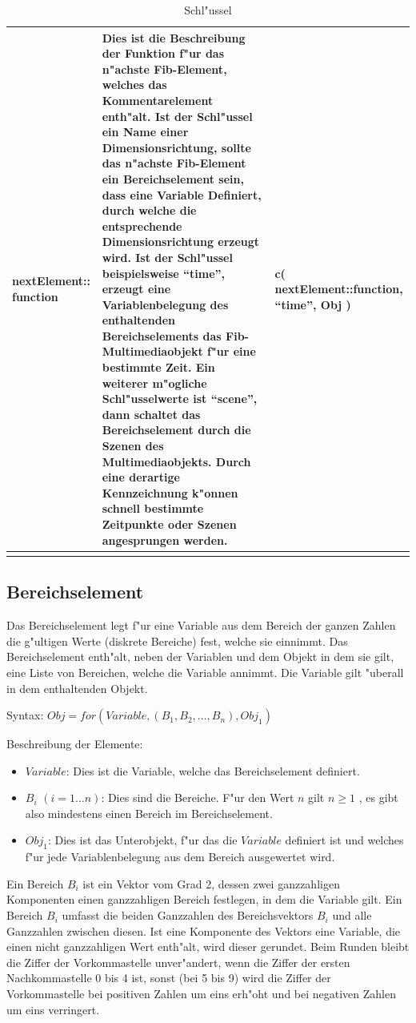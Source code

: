 \begin{center}
\begin{longtable}{|p{20mm}|p{55mm}|p{50mm}|}
	nextElement:: function & Dies ist die Beschreibung der Funktion f"ur das n"achste Fib-Element, welches das Kommentarelement enth"alt. Ist der Schl"ussel ein Name einer Dimensionsrichtung, sollte das n"achste Fib-Element ein Bereichselement sein, dass eine Variable Definiert, durch welche die entsprechende Dimensionsrichtung erzeugt wird. Ist der Schl"ussel beispielsweise ``time'', erzeugt eine Variablenbelegung des enthaltenden Bereichselements das Fib-Multimediaobjekt f"ur eine bestimmte Zeit. Ein weiterer m"ogliche Schl"usselwerte ist ``scene'', dann schaltet das Bereichselement durch die Szenen des Multimediaobjekts. Durch eine derartige Kennzeichnung k"onnen schnell bestimmte Zeitpunkte oder Szenen angesprungen werden. & c( nextElement::function, ``time'', Obj )\\\hline
\caption{Schl"ussel}
\label{tabPropertyKeys}
\end{longtable}
\end{center}



\subsection{Bereichselement}
\label{fibArea}\label{secFibArea}

Das Bereichselement legt f"ur eine Variable aus dem Bereich der ganzen Zahlen die g"ultigen Werte (diskrete Bereiche) fest, welche sie einnimmt. Das Ber\-eichs\-ele\-ment enth"alt, neben der Variablen und dem Objekt in dem sie gilt, eine Liste von Bereichen, welche die Variable annimmt. Die Variable gilt "uberall in dem enthaltenden Objekt.

\bigskip\noindent
Syntax:
$Obj = for( Variable,(B_{1}, B_{2},\ldots, B_{n}), Obj_1 )$

\bigskip\noindent
Beschreibung der Elemente:
\begin{itemize}
 \item $Variable$: Dies ist die Variable, welche das Bereichselement definiert.
 \item $B_{i}$ $(i = 1 \ldots n)$: Dies sind die Bereiche. F"ur den Wert $n$ gilt $n \geq 1$ , es gibt also mindestens einen Bereich im Bereichselement.
 \item $Obj_1$: Dies ist das Unterobjekt, f"ur das die $Variable$ definiert ist und welches f"ur jede Variablenbelegung aus dem Bereich ausgewertet wird.
\end{itemize}

Ein Bereich $B_{i}$ ist ein Vektor vom Grad 2, dessen zwei ganzzahligen Komponenten einen ganzzahligen Bereich festlegen, in dem die Variable gilt. Ein Bereich $B_{i}$ umfasst die beiden Ganzzahlen des Bereichsvektors $B_{i}$ und alle Ganzzahlen zwischen diesen.
Ist eine Komponente des Vektors eine Variable, die einen nicht ganzzahligen Wert enth"alt, wird dieser gerundet. Beim Runden bleibt die Ziffer der Vorkommastelle unver"andert, wenn die Ziffer der ersten Nachkommastelle 0 bis 4 ist, sonst (bei 5 bis 9) wird die Ziffer der Vorkommastelle bei positiven Zahlen um eins erh"oht und bei negativen Zahlen um eins verringert.

